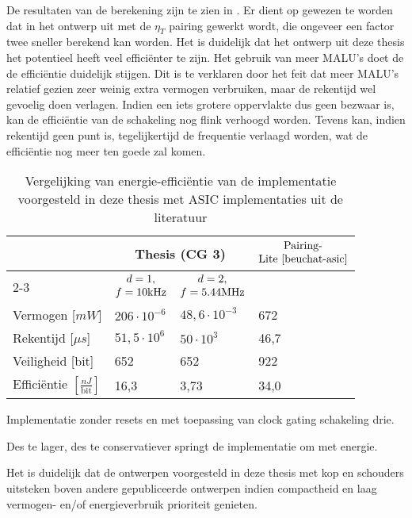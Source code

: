 De resultaten van de berekening zijn te zien in . Er dient op gewezen te worden dat in het ontwerp uit \cite{beuchat-asic} met de $\eta_T$ pairing gewerkt wordt, die ongeveer een factor twee sneller berekend kan worden. Het is duidelijk dat het ontwerp uit deze thesis het potentieel heeft veel effici\"enter te zijn. Het gebruik van meer MALU's doet de de effici\"entie duidelijk stijgen. Dit is te verklaren door het feit dat meer MALU's relatief gezien zeer weinig extra vermogen verbruiken, maar de rekentijd wel gevoelig doen verlagen. Indien een iets grotere oppervlakte dus geen bezwaar is, kan de effici\"entie van de schakeling nog flink verhoogd worden. Tevens kan, indien rekentijd geen punt is, tegelijkertijd de frequentie verlaagd worden, wat de effici\"entie nog meer ten goede zal komen. 

\begin{table}[h]
	\caption{Vergelijking van energie-effici\"entie van de implementatie voorgesteld in deze thesis met ASIC implementaties uit de literatuur}
	\label{tabel-resultaten-energie}

	\begin{narrow}{-2cm}{-2cm}
		\centering
		\begin{tabular}{llll}
			\toprule
			&	\multicolumn{2}{c}{Thesis (CG 3)\footnotemark[2]}	& \multirow{3}{*}{$\begin{array}{@{}c@{}}\text{Pairing-}\\\text{Lite \cite{beuchat-asic}}\end{array}$}\\
			\cmidrule(r){2-3}
			& \multicolumn{1}{c}{$\begin{array}{@{}c@{}}d = 1,\\f = 10\text{kHz}\end{array}$} & \multicolumn{1}{c}{$\begin{array}{@{}c@{}}d = 2,\\f = 5.44\text{MHz}\end{array}$} &\\
	 		\midrule
			Vermogen [$mW$]																& $206 \cdot 10^{-6}$		& $48,6 \cdot 10^{-3}$		& 672\\
			Rekentijd [$\mu s$]															& $51,5 \cdot 10^6$			& $50 \cdot 10^3$				& 46,7\\
			Veiligheid [bit]																& 652								& 652								& 922\\
			Effici\"entie $\left[ \frac{nJ}{\text{bit}}\right]$\footnotemark[3]	& 16,3					& 3,73							& 34,0\\
			\bottomrule		
		\end{tabular}
	\end{narrow}
		
	\footnotesize \footnotemark[2] Implementatie zonder resets en met toepassing van clock gating schakeling drie.
	
	\footnotemark[3] Des te lager, des te conservatiever springt de implementatie om met energie. %
\end{table}

Het is duidelijk dat de ontwerpen voorgesteld in deze thesis met kop en schouders uitsteken boven andere gepubliceerde ontwerpen indien compactheid en laag vermogen- en/of energieverbruik prioriteit genieten.
